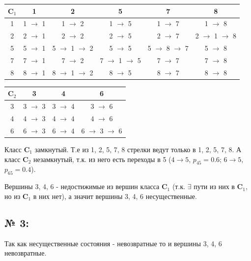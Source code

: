 \documentclass[12pt]{spbstu-task}
\begin{document}
\begin{table}[H]
\centering
\begin{minipage}[t]{\textwidth}
\begin{center}
\begin{tabular}[t]{c|ccccc}
\(\mathbf{C}_1\) & 1 & 2 & 5 & 7 & 8\\
\hline
1 & 1 \(\to\) 1 & 1 \(\to\) 2 & 1 \(\to\) 5 & 1 \(\to\) 7 & 1 \(\to\) 8\\
2 & 2 \(\to\) 1 & 2 \(\to\) 2 & 2 \(\to\) 5 & 2 \(\to\) 7 & 2 \(\to\) 1 \(\to\) 8\\
5 & 5 \(\to\) 1 & 5 \(\to\) 1 \(\to\) 2 & 5 \(\to\) 5 & 5 \(\to\) 8 \(\to\) 7 & 5 \(\to\) 8\\
7 & 7 \(\to\) 1 & 7 \(\to\) 2 & 7 \(\to\) 1 \(\to\) 5 & 7 \(\to\) 7 & 7 \(\to\) 8\\
8 & 8 \(\to\) 1 & 8 \(\to\) 1 \(\to\) 2 & 8 \(\to\) 5 & 8 \(\to\) 7 & 8 \(\to\) 8\\
\end{tabular}
\end{center}
\end{minipage}

\vspace{8pt}
\begin{minipage}[t]{.5\textwidth}
\begin{center}
\begin{tabular}[t]{c|ccc}
\(\mathbf{C}_2\) & 3 & 4 & 6\\
\hline
3 & 3 \(\to\) 3 & 3 \(\to\) 4 & 3 \(\to\) 6\\
4 & 4 \(\to\) 3 & 4 \(\to\) 4 & 4 \(\to\) 6\\
6 & 6 \(\to\) 3 & 6 \(\to\) 4 & 6 \(\to\) 3 \(\to\) 6\\
\end{tabular}
\end{center}
\end{minipage}
\end{table}

Класс \(\mathbf{C}_1\) замкнутый. Т.е из 1, 2, 5, 7, 8 стрелки ведут только в 1, 2, 5, 7, 8. А класс \(\mathbf{C}_2\) незамкнутый, т.к. из него есть переходы в 5 (\(4 \to 5\), \(p_{45} = 0.6\);
\(6 \to 5\), \(p_{65} = 0.4\)).

Вершины 3, 4, 6 - недостижимые из вершин класса \(\mathbf{C}_1\) (т.к. \(\exists\) пути
из них в \(\mathbf{C}_1\), но из \(\mathbf{C}_1\) в них нет), а значит вершины 3, 4, 6 несущественные.

\subsection*{№ 3:}
Так как несущественные состояния - невозвратные то и вершины 3, 4, 6 невозвратные.
\end{document}
